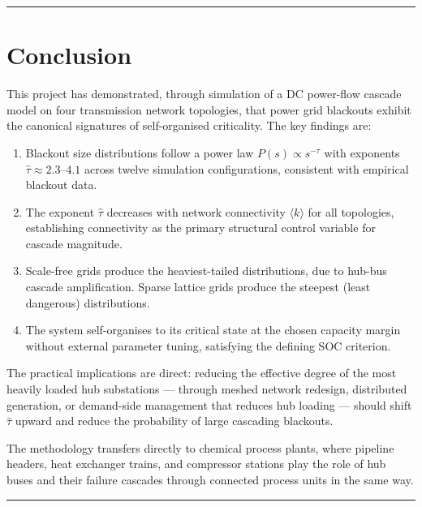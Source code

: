 \documentclass[12pt,a4paper]{article}
\begin{document}
\vspace{1em}
\hrule

\section{Conclusion}
\label{sec:conclusion}

This project has demonstrated, through simulation of a DC power-flow
cascade model on four transmission network topologies, that power
grid blackouts exhibit the canonical signatures of self-organised
criticality. The key findings are:

\begin{enumerate}
    \item Blackout size distributions follow a power law
          $P(s) \propto s^{-\tau}$ with exponents
          $\hat{\tau} \approx 2.3$--$4.1$ across twelve simulation
          configurations, consistent with empirical blackout data.
    \item The exponent $\hat{\tau}$ decreases with network connectivity
          $\langle k \rangle$ for all topologies, establishing
          connectivity as the primary structural control variable
          for cascade magnitude.
    \item Scale-free grids produce the heaviest-tailed distributions,
          due to hub-bus cascade amplification. Sparse lattice grids
          produce the steepest (least dangerous) distributions.
    \item The system self-organises to its critical state at the
          chosen capacity margin without external parameter tuning,
          satisfying the defining SOC criterion.
\end{enumerate}

The practical implications are direct: reducing the effective degree
of the most heavily loaded hub substations — through meshed network
redesign, distributed generation, or demand-side management that
reduces hub loading — should shift $\hat{\tau}$ upward and reduce
the probability of large cascading blackouts.

The methodology transfers directly to chemical process plants,
where pipeline headers, heat exchanger trains, and compressor
stations play the role of hub buses and their failure cascades
through connected process units in the same way.

\vspace{1em}
\hrule
\end{document}
